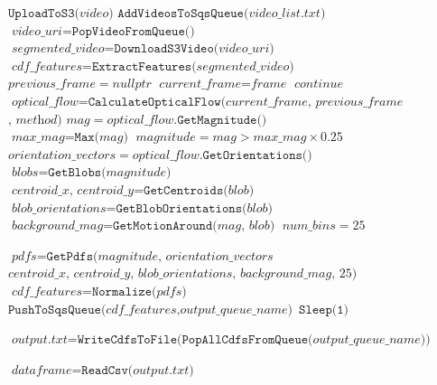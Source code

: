 \begin{figure}[h]
\begin{algorithmic}[1]

    \State $\texttt{UploadToS3(}\textit{video}\texttt{)}$
  \EndFor
  \State $\texttt{AddVideosToSqsQueue(}\textit{video\_list.txt}\texttt{)}$
  \State $\textit{video\_uri} = \texttt{PopVideoFromQueue()}$
  \State $\textit{segmented\_video} = \texttt{DownloadS3Video(}\textit{video\_uri}\texttt{)}$
  \State $\textit{cdf\_features} = \texttt{ExtractFeatures(}\textit{segmented\_video}\texttt{)}$
  \State $\textit{previous\_frame} = nullptr$
    \State $\textit{current\_frame} = \textit{frame}$
      \State $continue$
    \EndIf
    \State $\textit{optical\_flow} = \texttt{CalculateOpticalFlow(}\textit{current\_frame, previous\_frame}$
    \Statex $\textit{, method} \texttt{)}$
    \State $\textit{mag} = \textit{optical\_flow}.\texttt{GetMagnitude()}$
    \State $\textit{max\_mag} = \texttt{Max(} \textit{mag} \texttt{)}$
    \State $\textit{magnitude} = \textit{mag} > \textit{max\_mag} \times 0.25$
    \State $\textit{orientation\_vectors} = \textit{optical\_flow}.\texttt{GetOrientations()}$
    \State $\textit{blobs} = \texttt{GetBlobs(} \textit{magnitude}\texttt{)}$
      \State $\textit{centroid\_x, centroid\_y} = \texttt{GetCentroids(} \textit{blob} \texttt{)}$
      \State $\textit{blob\_orientations} = \texttt{GetBlobOrientations(} \textit{blob} \texttt{)}$
      \State $\textit{background\_mag} = \texttt{GetMotionAround(} \textit{mag, blob} \texttt{)}$
    \EndFor
    \State $\textit{num\_bins} = 25$

    \State $\textit{pdfs} = \texttt{GetPdfs(} \textit{magnitude, orientation\_vectors} $
    \Statex $\textit{centroid\_x, centroid\_y, blob\_orientations, background\_mag, 25} \texttt{)}$
  \EndFor
  \State $\textit{cdf\_features} = \texttt{Normalize(}\textit{pdfs}\texttt{)}$
  \State $\texttt{PushToSqsQueue(}\textit{cdf\_features}, \textit{output\_queue\_name} \texttt{)}$
    \State $\texttt{Sleep(1)}$
  \EndWhile

  \State $\textit{output.txt} = \texttt{WriteCdfsToFile(PopAllCdfsFromQueue(}\textit{output\_queue\_name} \texttt{))}$

  \State $\textit{dataframe} = \texttt{ReadCsv(} \textit{output.txt} \texttt{)}$



\end{algorithmic}
\end{figure}
